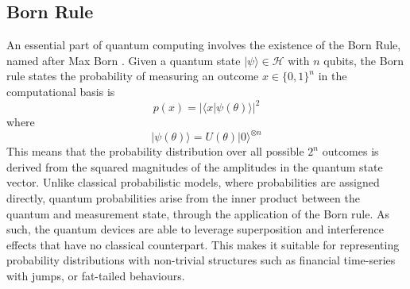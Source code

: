 \documentclass[12pt]{article}
\numberwithin{equation}{section}
\begin{document}
\subsection{Born Rule}
An essential part of quantum computing involves the existence of the Born
Rule, named after Max Born \autocite{stoica_2022_born}. Given a quantum state $|\psi\rangle \in \mathcal{H}$ with $n$ qubits, the Born rule states 
the probability of measuring an outcome $x \in \{0,1\}^n$ in the computational 
basis is
\begin{equation}
p(x) = |\langle x|\psi(\theta)\rangle|^2
\end{equation} where 
\begin{equation}
|\psi(\theta)\rangle = U(\theta)|0\rangle^{\otimes n}
\end{equation}
This means that the probability distribution over all possible $2^n$ outcomes 
is derived from the squared magnitudes of the amplitudes in the quantum state 
vector. Unlike classical probabilistic models, where probabilities are assigned 
directly, quantum probabilities arise from the inner product between the quantum 
and measurement state, through the application of the Born rule. As such, the 
quantum devices are able to leverage superposition and interference effects that 
have no classical counterpart. This makes it suitable for representing probability 
distributions with non-trivial structures such as financial time-series with jumps, 
or fat-tailed behaviours.
\end{document}
